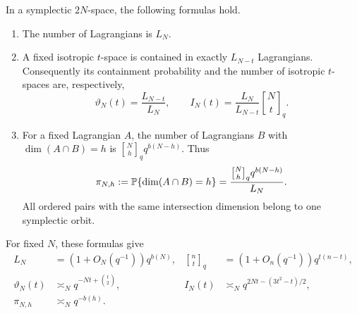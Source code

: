 \begin{lemma}
\label{lem:lagrangian-counts}
In a symplectic $2N$-space, the following formulas hold.
\begin{enumerate}
 \item The number of Lagrangians is $L_N$.
 \item A fixed isotropic $t$-space is contained in exactly $L_{N-t}$
 Lagrangians.  Consequently its containment probability and the number of
 isotropic $t$-spaces are, respectively,
 \begin{equation}
 \vartheta_N(t)=\frac{L_{N-t}}{L_N},\qquad
 I_N(t)=\frac{L_N}{L_{N-t}}\genfrac{[}{]}{0pt}{}{N}{t}_q.
 \label{eq:orbits-containment}
 \end{equation}
 \item For a fixed Lagrangian $A$, the number of Lagrangians $B$ with
 $\dim(A\cap B)=h$ is $\genfrac{[}{]}{0pt}{}{N}{h}_q q^{b(N-h)}$.  Thus
 \begin{equation}
 \pi_{N,h}:=\P\{\dim(A\cap B)=h\}
 =\frac{\genfrac{[}{]}{0pt}{}{N}{h}_q q^{b(N-h)}}{L_N}.
 \label{eq:orbits-pair-probability}
 \end{equation}
 All ordered pairs with the same intersection dimension belong to one
 symplectic orbit.
\end{enumerate}
For fixed $N$, these formulas give
\begin{align}
 L_N&=(1+O_N(q^{-1}))q^{b(N)},
 &\genfrac{[}{]}{0pt}{}{n}{t}_q&=(1+O_n(q^{-1}))q^{t(n-t)},\\
 \vartheta_N(t)&\asymp_N q^{-Nt+\binom t2},
 &I_N(t)&\asymp_N q^{2Nt-(3t^2-t)/2},\\
 \pi_{N,h}&\asymp_N q^{-b(h)}.
 \label{eq:orbits-count-exponents}
\end{align}
\end{lemma}

